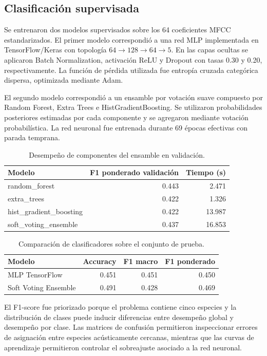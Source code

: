 \subsection{Clasificaci\'on supervisada}
Se entrenaron dos modelos supervisados sobre los 64 coeficientes MFCC estandarizados. El primer modelo correspondi\'o a una red MLP implementada en TensorFlow/Keras con topolog\'ia $64 \rightarrow 128 \rightarrow 64 \rightarrow 5$. En las capas ocultas se aplicaron Batch Normalization, activaci\'on ReLU y Dropout con tasas 0.30 y 0.20, respectivamente. La funci\'on de p\'erdida utilizada fue entrop\'ia cruzada categ\'orica dispersa, optimizada mediante Adam.

El segundo modelo correspondi\'o a un ensamble por votaci\'on suave compuesto por Random Forest, Extra Trees e HistGradientBoosting. Se utilizaron probabilidades posteriores estimadas por cada componente y se agregaron mediante votaci\'on probabil\'istica. La red neuronal fue entrenada durante 69 \'epocas efectivas con parada temprana.

\begin{table}[H]
\centering
\caption{Desempe\~no de componentes del ensamble en validaci\'on.}
\begin{tabular}{lrr}
\hline
Modelo & F1 ponderado validaci\'on & Tiempo (s) \\
\hline
random_forest & 0.443 & 2.471 \\
extra_trees & 0.422 & 1.326 \\
hist_gradient_boosting & 0.422 & 13.987 \\
soft_voting_ensemble & 0.437 & 16.853 \\
\hline
\end{tabular}
\end{table}

\begin{table}[H]
\centering
\caption{Comparaci\'on de clasificadores sobre el conjunto de prueba.}
\begin{tabular}{lrrr}
\hline
Modelo & Accuracy & F1 macro & F1 ponderado \\
\hline
MLP TensorFlow & 0.451 & 0.451 & 0.450 \\
Soft Voting Ensemble & 0.491 & 0.428 & 0.469 \\
\hline
\end{tabular}
\end{table}

El F1-score fue priorizado porque el problema contiene cinco especies y la distribuci\'on de clases puede inducir diferencias entre desempe\~no global y desempe\~no por clase. Las matrices de confusi\'on permitieron inspeccionar errores de asignaci\'on entre especies ac\'usticamente cercanas, mientras que las curvas de aprendizaje permitieron controlar el sobreajuste asociado a la red neuronal.

